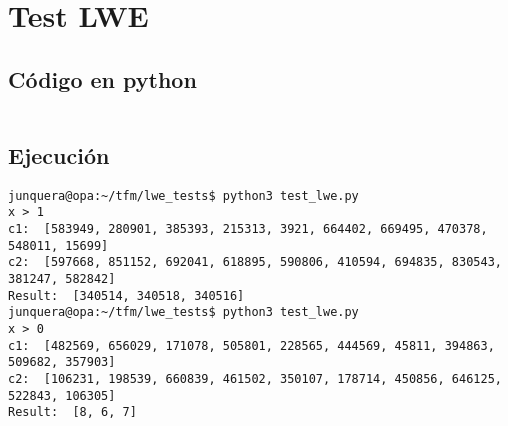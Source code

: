 \chapter{Test LWE}
\label{appendix:test_lwe}

\section{Código en python}

\inputminted{python}{apendices/test_lwe.py}

\section{Ejecución}

\begin{verbatim}
junquera@opa:~/tfm/lwe_tests$ python3 test_lwe.py 
x > 1
c1:  [583949, 280901, 385393, 215313, 3921, 664402, 669495, 470378, 548011, 15699]
c2:  [597668, 851152, 692041, 618895, 590806, 410594, 694835, 830543, 381247, 582842]
Result:  [340514, 340518, 340516]
junquera@opa:~/tfm/lwe_tests$ python3 test_lwe.py 
x > 0
c1:  [482569, 656029, 171078, 505801, 228565, 444569, 45811, 394863, 509682, 357903]
c2:  [106231, 198539, 660839, 461502, 350107, 178714, 450856, 646125, 522843, 106305]
Result:  [8, 6, 7]
\end{verbatim}